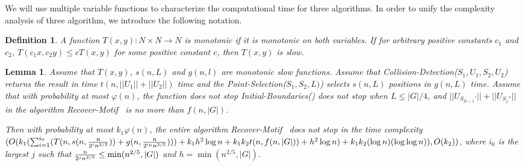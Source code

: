 \documentclass[11pt]{article}
\newtheorem{lemmafoo}[theoremfoo]{Lemma}
\newenvironment{lemma}{\pagebreak[1]\begin{lemmafoo}}{\end{lemmafoo}}
\newtheorem{dfntn}[theoremfoo]{Definition}
\newenvironment{definition}{\pagebreak[1]\begin{dfntn}\rm}{\end{dfntn}}
\newcommand{\algmnam}{Recover-Motif}
\begin{document}
We will use multiple variable functions to characterize the
computational time for three algorithms. In order to unify the
complexity analysis of three algorithm, we introduce the following
notation.

\begin{definition}
A function $T(x,y): N\times N\rightarrow N$ is monotonic if it is
monotonic on both variables. If for arbitrary positive constants
$c_1$ and $c_2$,  $T(c_1x, c_2y)\le cT(x,y)$ for some positive
constant $c$, then $T(x,y)$ is {\it slow}.
\end{definition}

\begin{lemma}\label{total-time-lemma} Assume that $T(x,y)$, $s(n,L)$
and $g(n,l)$ are monotonic slow functions.
 Assume that Collision-Detection($S_1, U_1, S_2, U_2$) returns
 the result in time $t(n, ||U_1||+||U_2||)$ time and the Point-Selection($S_1, S_2,L)$) selects $s(n,L)$ positions in
 $g(n,L)$ time.
Assume that with probability at most $\varphi(n)$, the function does
not stop Initial-Boundaries() does not stop when $L\le |G|/4$, and
$||U_{S_{2i-1}'}||+||U_{S_j''}||$ in the algorithm \algmnam~ is no
more than $f(n,|G|)$.

 Then with probability at most $k_1\varphi(n)$,
the entire algorithm \algmnam~  does not stop in the time complexity
$(O(k_1(\sum_{i=1}^{i_0}(T(n,s(n,{n\over 2^in^{2/5}}))+g(n,{n\over
2^{i_0}n^{2/5}})))+k_1h^2\log n+k_1k_2 t(n,f(n, |G|))+h^2\log
n)+k_1k_2(\log n)(\log\log n)), O(k_2))$, where $i_0$ is the largest
$j$ such that ${n\over 2^jn^{2/5}}\le \min(n^{2/5},|G|)$ and
$h=\min(n^{2/5}, |G|)$.
\end{lemma}
\end{document}
